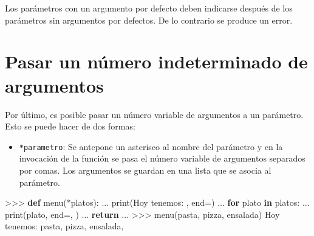 \documentclass[
  spanish,
  a4paper,
]{scrreport}
\newenvironment{Shaded}{\begin{snugshade}}{\end{snugshade}}
\newcommand{\BuiltInTok}[1]{\textcolor[rgb]{0.00,0.23,0.31}{#1}}
\newcommand{\ControlFlowTok}[1]{\textcolor[rgb]{0.00,0.23,0.31}{\textbf{#1}}}
\newcommand{\KeywordTok}[1]{\textcolor[rgb]{0.00,0.23,0.31}{\textbf{#1}}}
\newcommand{\NormalTok}[1]{\textcolor[rgb]{0.00,0.23,0.31}{#1}}
\newcommand{\OperatorTok}[1]{\textcolor[rgb]{0.37,0.37,0.37}{#1}}
\newcommand{\StringTok}[1]{\textcolor[rgb]{0.13,0.47,0.30}{#1}}
\providecommand{\tightlist}{%
  \setlength{\itemsep}{0pt}\setlength{\parskip}{0pt}}
\begin{document}
\begin{tcolorbox}[enhanced jigsaw, arc=.35mm, bottomrule=.15mm, bottomtitle=1mm, breakable, colback=white, colbacktitle=quarto-callout-warning-color!10!white, colframe=quarto-callout-warning-color-frame, coltitle=black, left=2mm, leftrule=.75mm, opacityback=0, opacitybacktitle=0.6, rightrule=.15mm, title=\textcolor{quarto-callout-warning-color}{\faExclamationTriangle}\hspace{0.5em}{Advertencia}, titlerule=0mm, toprule=.15mm, toptitle=1mm]

Los parámetros con un argumento por defecto deben indicarse después de
los parámetros sin argumentos por defectos. De lo contrario se produce
un error.

\end{tcolorbox}

\section{Pasar un número indeterminado de
argumentos}\label{pasar-un-nuxfamero-indeterminado-de-argumentos}

Por último, es posible pasar un número variable de argumentos a un
parámetro. Esto se puede hacer de dos formas:

\begin{itemize}
\tightlist
\item
  \texttt{*parametro}: Se antepone un asterisco al nombre del parámetro
  y en la invocación de la función se pasa el número variable de
  argumentos separados por comas. Los argumentos se guardan en una lista
  que se asocia al parámetro.
\end{itemize}

\begin{Shaded}
\begin{Highlighting}[]
\OperatorTok{\textgreater{}\textgreater{}\textgreater{}} \KeywordTok{def}\NormalTok{ menu(}\OperatorTok{*}\NormalTok{platos):}
\NormalTok{...     }\BuiltInTok{print}\NormalTok{(}\StringTok{\textquotesingle{}Hoy tenemos: \textquotesingle{}}\NormalTok{, end}\OperatorTok{=}\StringTok{\textquotesingle{}\textquotesingle{}}\NormalTok{)}
\NormalTok{...     }\ControlFlowTok{for}\NormalTok{ plato }\KeywordTok{in}\NormalTok{ platos:}
\NormalTok{...         }\BuiltInTok{print}\NormalTok{(plato, end}\OperatorTok{=}\StringTok{\textquotesingle{}, \textquotesingle{}}\NormalTok{)}
\NormalTok{...     }\ControlFlowTok{return}
\NormalTok{...}
\OperatorTok{\textgreater{}\textgreater{}\textgreater{}}\NormalTok{ menu(}\StringTok{\textquotesingle{}pasta\textquotesingle{}}\NormalTok{, }\StringTok{\textquotesingle{}pizza\textquotesingle{}}\NormalTok{, }\StringTok{\textquotesingle{}ensalada\textquotesingle{}}\NormalTok{)}
\NormalTok{Hoy tenemos: pasta, pizza, ensalada,}
\end{Highlighting}
\end{Shaded}
\end{document}
